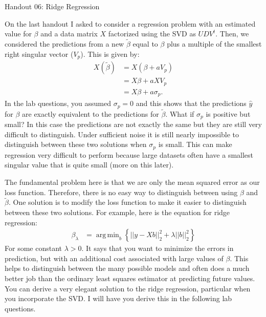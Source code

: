 \documentclass[12pt,hidelinks]{article}
\DeclareMathOperator*{\argmin}{arg\,min}
\numberwithin{equation}{section}
\begin{document}
{\LARGE Handout 06: Ridge Regression}

\vspace*{18pt}

On the last handout I asked to consider a regression problem with an estimated
value for $\beta$ and a data matrix $X$ factorized using the SVD as $UDV^{t}$.
Then, we considered the predictions from a new $\tilde{\beta}$ equal to $\beta$
plus a multiple of the smallest right singular vector ($V_p$). This is given
by:
\begin{align}
X(\tilde{\beta}) &= X(\beta + a V_p) \\
&= X\beta + a X V_p \\
&= X\beta + a \sigma_p.
\end{align}
In the lab questions, you assumed $\sigma_p=0$ and this shows that the predictions
$\widehat{y}$ for $\beta$ are exactly equivalent to the predictions for $\tilde{\beta}$.
What if $\sigma_p$ is positive but small? In this case the predictions are not
exactly the same but they are still very difficult to distinguish. Under sufficient
noise it is still nearly impossible to distinguish between these two solutions when
$\sigma_p$ is small. This can make regression very difficult to perform because
large datasets often have a smallest singular value that is quite small (more on
this later).

The fundamental problem here is that we are only the mean squared error as our
loss function. Therefore, there is no easy way to distinguish between using
$\beta$ and $\tilde{\beta}$. One solution is to modify the loss function to make
it easier to distinguish between these two solutions. For example, here is the
equation for ridge regression:
\begin{align}
\beta_{\lambda} &= \argmin_b \left\{ || y - Xb||_2^2 + \lambda ||b||_2^2 \right\}
\end{align}
For some constant $\lambda > 0$. It says that you want to minimize the errors
in prediction, but with an additional cost associated with large values of $\beta$.
This helps to distinguish between the many possible models and often does a much
better job than the ordinary least squares estimator at predicting future values.
You can derive a very elegant solution to the ridge regression, particular when
you incorporate the SVD. I will have you derive this in the following lab questions.


\end{document}
